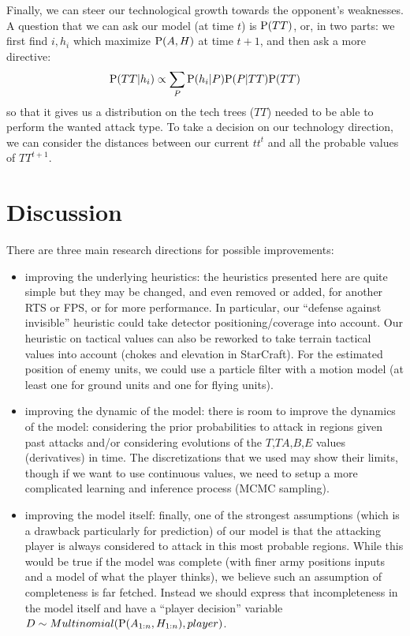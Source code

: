 Finally, we can steer our technological growth towards the opponent's weaknesses. A question that we can ask our model (at time $t$) is $\mathrm{P}(TT)$, or, in two parts: we first find $i,h_i$ which maximize $\mathrm{P}(A,H)$ at time $t+1$, and then ask a more directive:
$$\mathrm{P}(TT|h_i) \propto \sum_{P} \mathrm{P}(h_i|P)\mathrm{P}(P|TT)\mathrm{P}(TT)$$
so that it gives us a distribution on the tech trees ($TT$) needed to be able to perform the wanted attack type. To take a decision on our technology direction, we can consider the distances between our current $tt^t$ and all the probable values of $TT^{t+1}$.

\section{Discussion}
There are three main research directions for possible improvements:
\begin{itemize}
    \item improving the underlying heuristics: the heuristics presented here are quite simple but they may be changed, and even removed or added, for another RTS or FPS, or for more performance. In particular, our ``defense against invisible'' heuristic could take detector positioning/coverage into account. Our heuristic on tactical values can also be reworked to take terrain tactical values into account (chokes and elevation in StarCraft). For the estimated position of enemy units, we could use a particle filter \cite{weber2011aiide} with a motion model (at least one for ground units and one for flying units). 
    \item improving the dynamic of the model: there is room to improve the dynamics of the model: considering the prior probabilities to attack in regions given past attacks and/or considering evolutions of the $T$,$TA$,$B$,$E$ values (derivatives) in time. The discretizations that we used may show their limits, though if we want to use continuous values, we need to setup a more complicated learning and inference process (MCMC sampling).
    \item improving the model itself: finally, one of the strongest assumptions (which is a drawback particularly for prediction) of our model is that the attacking player is always considered to attack in this most probable regions. While this would be true if the model was complete (with finer army positions inputs and a model of what the player thinks), we believe such an assumption of completeness is far fetched. Instead we should express that incompleteness in the model itself and have a ``player decision'' variable $D \sim Multinomial(\mathrm{P}(A_{1:n},H_{1:n}),player)$.
\end{itemize} 


